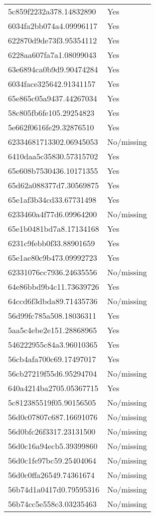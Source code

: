 \begin{tabular}{ll}
5c859f2232a378.14832890 & Yes \\
6034fa2bb074a4.09996117 & Yes \\
622870d9de73f3.95354112 & Yes \\
6228aa607fa7a1.08099043 & Yes \\
63e6894ca0b9d9.90474284 & Yes \\
6034face325642.91341157 & Yes \\
65e865c05a9437.44267034 & Yes \\
58c805fb6fe105.29254823 & Yes \\
5e662f0616fe29.32876510 & Yes \\
62334681713302.06945053 & No/missing \\
6410daa5c35830.57315702 & Yes \\
65e608b7530436.10171355 & Yes \\
65d62a088377d7.30569875 & Yes \\
65e1af3b34cd33.67731498 & Yes \\
6233460a4f77d6.09964200 & No/missing \\
65e1b0481bd7a8.17134168 & Yes \\
6231c9febb0f33.88901659 & Yes \\
65e1ae80c9b473.09992723 & Yes \\
62331076cc7936.24635556 & No/missing \\
64e86bbd9b4c11.73639726 & Yes \\
64ccd6f3dbda89.71435736 & No/missing \\
56d99fc785a508.18036311 & Yes \\
5aa5c4ebe2e151.28868965 & Yes \\
546222955c84a3.96010365 & Yes \\
56cb4afa700c69.17497017 & Yes \\
56cb27219f55d6.95294704 & No/missing \\
640a4214ba2705.05367715 & Yes \\
5c812385519f05.90156505 & No/missing \\
56d0c07807c687.16691076 & No/missing \\
56d0bfc26f3317.23131500 & No/missing \\
56d0c16a94ecb5.39399860 & No/missing \\
56d0c1fe97bc59.25404064 & No/missing \\
56d0c0ffa26549.74361674 & No/missing \\
56b74d1a0417d0.79595316 & No/missing \\
56b74cc5e558c3.03235463 & No/missing \\

\end{tabular}
